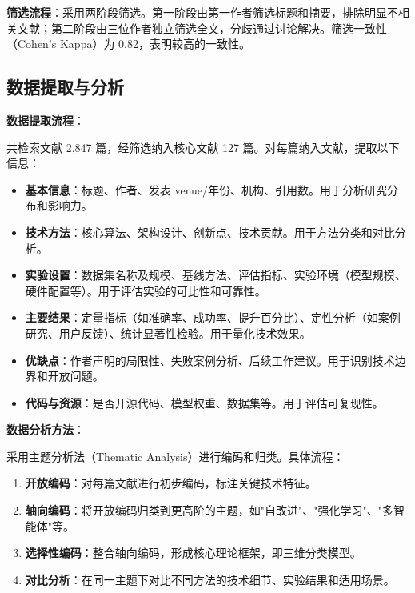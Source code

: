 \documentclass[12pt,a4paper]{article}
\begin{document}
\textbf{筛选流程}：采用两阶段筛选。第一阶段由第一作者筛选标题和摘要，排除明显不相关文献；第二阶段由三位作者独立筛选全文，分歧通过讨论解决。筛选一致性（Cohen's Kappa）为 0.82，表明较高的一致性。

\subsection{数据提取与分析}

\textbf{数据提取流程}：

共检索文献 2,847 篇，经筛选纳入核心文献 127 篇。对每篇纳入文献，提取以下信息：

\begin{itemize}
    \item \textbf{基本信息}：标题、作者、发表 venue/年份、机构、引用数。用于分析研究分布和影响力。
    
    \item \textbf{技术方法}：核心算法、架构设计、创新点、技术贡献。用于方法分类和对比分析。
    
    \item \textbf{实验设置}：数据集名称及规模、基线方法、评估指标、实验环境（模型规模、硬件配置等）。用于评估实验的可比性和可靠性。
    
    \item \textbf{主要结果}：定量指标（如准确率、成功率、提升百分比）、定性分析（如案例研究、用户反馈）、统计显著性检验。用于量化技术效果。
    
    \item \textbf{优缺点}：作者声明的局限性、失败案例分析、后续工作建议。用于识别技术边界和开放问题。
    
    \item \textbf{代码与资源}：是否开源代码、模型权重、数据集等。用于评估可复现性。
\end{itemize}

\textbf{数据分析方法}：

采用主题分析法（Thematic Analysis）进行编码和归类。具体流程：

\begin{enumerate}
    \item \textbf{开放编码}：对每篇文献进行初步编码，标注关键技术特征。
    \item \textbf{轴向编码}：将开放编码归类到更高阶的主题，如"自改进"、"强化学习"、"多智能体"等。
    \item \textbf{选择性编码}：整合轴向编码，形成核心理论框架，即三维分类模型。
    \item \textbf{对比分析}：在同一主题下对比不同方法的技术细节、实验结果和适用场景。
\end{enumerate}
\end{document}
